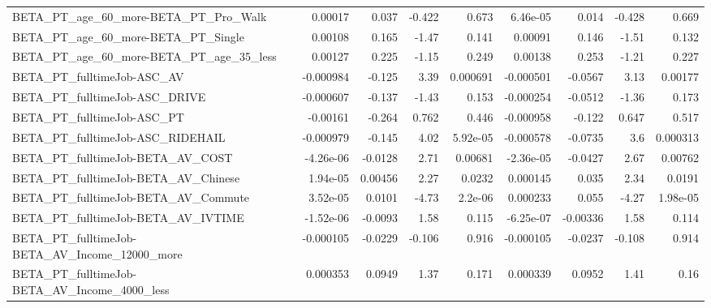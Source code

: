 \begin{tabular}{lrrrrrrrr}
BETA\_PT\_age\_60\_more-BETA\_PT\_Pro\_Walk               &     0.00017 &        0.037 &    -0.422 &    0.673 &   6.46e-05 &       0.014 &       -0.428 &         0.669 \\
BETA\_PT\_age\_60\_more-BETA\_PT\_Single                 &     0.00108 &        0.165 &     -1.47 &    0.141 &    0.00091 &       0.146 &        -1.51 &         0.132 \\
BETA\_PT\_age\_60\_more-BETA\_PT\_age\_35\_less            &     0.00127 &        0.225 &     -1.15 &    0.249 &    0.00138 &       0.253 &        -1.21 &         0.227 \\
BETA\_PT\_fulltimeJob-ASC\_AV                         &   -0.000984 &       -0.125 &      3.39 & 0.000691 &  -0.000501 &     -0.0567 &         3.13 &       0.00177 \\
BETA\_PT\_fulltimeJob-ASC\_DRIVE                      &   -0.000607 &       -0.137 &     -1.43 &    0.153 &  -0.000254 &     -0.0512 &        -1.36 &         0.173 \\
BETA\_PT\_fulltimeJob-ASC\_PT                         &    -0.00161 &       -0.264 &     0.762 &    0.446 &  -0.000958 &      -0.122 &        0.647 &         0.517 \\
BETA\_PT\_fulltimeJob-ASC\_RIDEHAIL                   &   -0.000979 &       -0.145 &      4.02 & 5.92e-05 &  -0.000578 &     -0.0735 &          3.6 &      0.000313 \\
BETA\_PT\_fulltimeJob-BETA\_AV\_COST                   &   -4.26e-06 &      -0.0128 &      2.71 &  0.00681 &  -2.36e-05 &     -0.0427 &         2.67 &       0.00762 \\
BETA\_PT\_fulltimeJob-BETA\_AV\_Chinese                &    1.94e-05 &      0.00456 &      2.27 &   0.0232 &   0.000145 &       0.035 &         2.34 &        0.0191 \\
BETA\_PT\_fulltimeJob-BETA\_AV\_Commute                &    3.52e-05 &       0.0101 &     -4.73 &  2.2e-06 &   0.000233 &       0.055 &        -4.27 &      1.98e-05 \\
BETA\_PT\_fulltimeJob-BETA\_AV\_IVTIME                 &   -1.52e-06 &      -0.0093 &      1.58 &    0.115 &  -6.25e-07 &    -0.00336 &         1.58 &         0.114 \\
BETA\_PT\_fulltimeJob-BETA\_AV\_Income\_12000\_more      &   -0.000105 &      -0.0229 &    -0.106 &    0.916 &  -0.000105 &     -0.0237 &       -0.108 &         0.914 \\
BETA\_PT\_fulltimeJob-BETA\_AV\_Income\_4000\_less       &    0.000353 &       0.0949 &      1.37 &    0.171 &   0.000339 &      0.0952 &         1.41 &          0.16 \\

\end{tabular}
